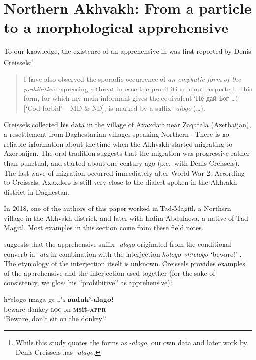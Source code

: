 \documentclass[output=paper,colorlinks,citecolor=brown]{langscibook}
\begin{document}
\section{Northern Akhvakh: From a particle to a morphological apprehensive}
\label{sec:NAkhvakh}
 
To our knowledge, the existence of an apprehensive in  was first reported by Denis Creissels:\footnote{While this study quotes the forms as \textit{-alogo}, our own data and later work by Denis Creissels \citeyear{Creisselsunpublished2} has \textit{-alago}.} 

\begin{quote}
    I have also observed the sporadic occurrence of \textit{an emphatic form of the prohibitive} expressing a threat in case the prohibition is not respected. This form, for which my main informant gives the  equivalent `Не дай Бог …!' [`God forbid' -- MD \& ND], is marked by a suffix \textit{-alogo} (\ldots). \citep{Creisselsunpublished1}
\end{quote}

Creissels collected his data in the village of Axaxdərə near Zaqatala (Azerbaijan), a resettlement from Daghestanian villages speaking Northern . There is no reliable information about the time when the Akhvakh started migrating to Azerbaijan. The oral tradition suggests that the migration was progressive rather than punctual, and started about one century ago (p.c.\  with Denis Creissels). The last wave of migration occurred immediately after World War 2. According to Creissels, Axaxdərə  is still very close to the dialect spoken in the Akhvakh district in Daghestan. 

In 2018, one of the authors of this paper worked in Tad-Magitl, a Northern  village in the Akhvakh district, and later with Indira Abdulaeva, a native of Tad-Magitl. Most examples in this section come from these field notes.

\citet{Creisselsunpublished2} suggests that the apprehensive suffix \textit{-alago} originated from the conditional converb in \nobreakdash-\textit{ala} in combination with the interjection \textit{hologo \textasciitilde hʷelogo} `beware!' . The etymology of the interjection itself is unknown. Creissels provides examples of the apprehensive and the interjection used together (for the sake of consistency, we gloss his ``prohibitive'' as apprehensive):

\ea \label{ex:DD60}
\gll hʷelogo imaχa-ge \textsc{l}'a \textbf{ʁad{\textlangle}u{\textrangle}k'-alago!} \\
beware donkey-\textsc{loc} on \textbf{\textsc{{\textlangle}m{\textrangle}}sit-\textsc{appr}} \\
\glt `Beware, don't sit on the donkey!' 
\citep{Creisselsunpublished1}
\z
\end{document}
